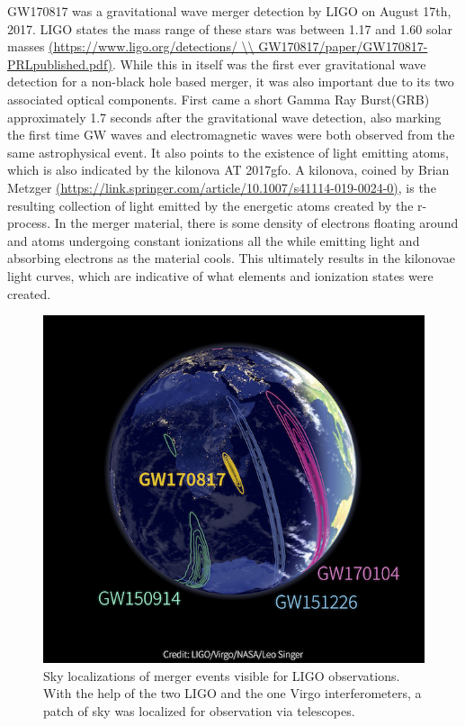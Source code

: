 \documentclass[11pt,a4paper]{article}
\begin{document}
GW170817 was a gravitational wave merger detection by LIGO on August 17th, 2017. LIGO states the mass range of these stars was between 1.17 and 1.60 solar masses \url{(https://www.ligo.org/detections/ \\ GW170817/paper/GW170817-PRLpublished.pdf)}. While this in itself was the first ever gravitational wave detection for a non-black hole based merger, it was also important due to its two associated optical components. 
First came a short Gamma Ray Burst(GRB) approximately 1.7 seconds after the gravitational wave detection, also marking the first time GW waves and electromagnetic waves were both observed from the same astrophysical event. It also points to the existence of light emitting atoms, which is also indicated by the kilonova AT 2017gfo. A kilonova, coined by Brian Metzger \url{(https://link.springer.com/article/10.1007/s41114-019-0024-0)}, is the resulting collection of light emitted by the energetic atoms created by the r-process. In the merger material, there is some density of electrons floating around and atoms undergoing constant ionizations all the while emitting light and absorbing electrons as the material cools. This ultimately results in the kilonovae light curves, which are indicative of what elements and ionization states were created. 

\begin{figure}[h!]
  \includegraphics[scale = .5, width=1\textwidth]{ligo.jpg}
  \caption{Sky localizations of merger events visible for LIGO observations. With the help of the two LIGO and the one Virgo interferometers, a patch of sky was localized for observation via telescopes. }
\end{figure}
\end{document}

